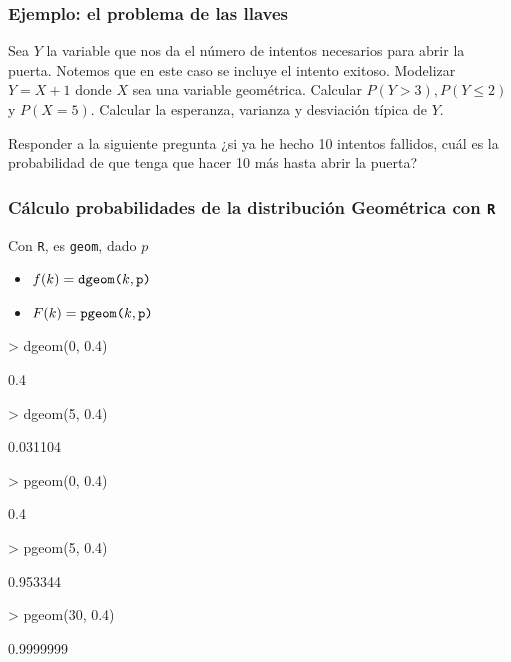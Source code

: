 \begin{frame}
\frametitle{Ejemplo: el problema de las llaves}
Sea $Y$ la variable que nos da el número de intentos necesarios para abrir la puerta. Notemos que en este caso se  incluye el intento exitoso. Modelizar $Y=X+1$ donde $X$ sea una variable geométrica. Calcular $P(Y>3), P(Y\leq2)$ y $P(X=5)$. Calcular la esperanza, varianza y desviación típica de $Y$.

Responder a la siguiente pregunta ¿si ya he hecho 10 intentos fallidos, cuál es la probabilidad de que tenga que hacer 10 más hasta abrir la  puerta?
\end{frame}




\begin{frame}[fragile]
\frametitle{Cálculo probabilidades de la distribución Geométrica con \texttt{R}}

Con \texttt{R}, es \texttt{geom}, dado $p$
\begin{itemize}
\item $f(k)=\mbox{\texttt{dgeom(}}k,\texttt{p)}$

\item $F(k)=\mbox{\texttt{pgeom(}}k,\texttt{p)}$
\end{itemize}
\begin{Schunk}
\begin{Sinput}
> dgeom(0, 0.4)
\end{Sinput}
\begin{Soutput}
[1] 0.4
\end{Soutput}
\begin{Sinput}
> dgeom(5, 0.4)
\end{Sinput}
\begin{Soutput}
[1] 0.031104
\end{Soutput}
\begin{Sinput}
> pgeom(0, 0.4)
\end{Sinput}
\begin{Soutput}
[1] 0.4
\end{Soutput}
\begin{Sinput}
> pgeom(5, 0.4)
\end{Sinput}
\begin{Soutput}
[1] 0.953344
\end{Soutput}
\begin{Sinput}
> pgeom(30, 0.4)
\end{Sinput}
\begin{Soutput}
[1] 0.9999999
\end{Soutput}
\end{Schunk}
\end{frame}

